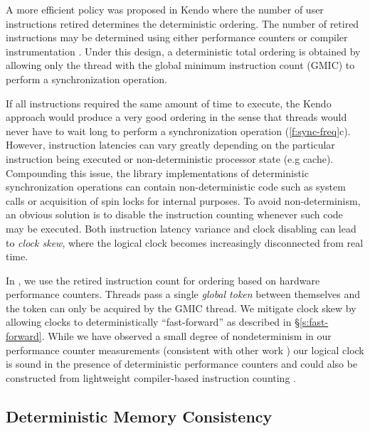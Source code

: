 A more efficient policy was proposed in Kendo \cite{olszewski_kendo:_2009} where the number of user instructions retired determines the deterministic ordering. The number of retired instructions may be determined using either performance counters \cite{olszewski_kendo:_2009,devietti_rcdc:_2011} or compiler instrumentation \cite{kai_lu_efficient_2014}. Under this design, a deterministic total ordering is obtained by allowing only the thread with the global minimum instruction count (GMIC) to perform a synchronization operation.

If all instructions required the same amount of time to execute, the Kendo approach would produce a very good ordering in the sense that threads would never have to wait long to perform a synchronization operation (\autoref{f:sync-freq}c). However, instruction latencies can vary greatly depending on the particular instruction being executed or non-deterministic processor state (e.g cache). Compounding this issue, the library implementations of deterministic synchronization operations can contain non-deterministic code such as system calls or acquisition of spin locks for internal purposes. To avoid non-determinism, an obvious solution is to disable the instruction counting whenever such code may be executed. Both instruction latency variance and clock disabling can lead to {\it clock skew}, where the logical clock becomes increasingly disconnected from real time.

In \lib{}, we use the retired instruction count for ordering based on hardware performance counters. Threads pass a single \emph{global token} between themselves and the token can only be acquired by the GMIC thread. We mitigate clock skew by allowing clocks to deterministically ``fast-forward'' as described in \S\ref{s:fast-forward}. While we have observed a small degree of nondeterminism in our performance counter measurements (consistent with other work \cite{4636099}) our logical clock is sound in the presence of deterministic performance counters and could also be constructed from lightweight compiler-based instruction counting \cite{kai_lu_efficient_2014}.

\subsection{Deterministic Memory Consistency}

